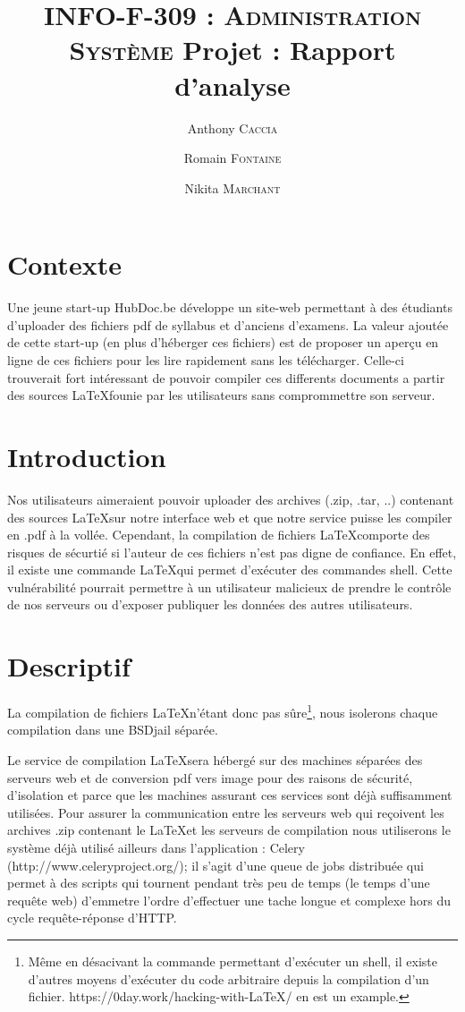 \documentclass[10pt,a4paper]{article}
\author{Anthony \textsc{Caccia} \and Romain \textsc{Fontaine} \and Nikita \textsc{Marchant} }
\date{}
\title{\textsc{INFO-F-309 : Administration Système} Projet : Rapport d'analyse}
\begin{document}
\maketitle

\section{Contexte}

Une jeune start-up HubDoc.be développe un site-web permettant à des étudiants d'uploader des fichiers pdf de syllabus et d'anciens d'examens.
La valeur ajoutée de cette start-up (en plus d'héberger ces fichiers) est de proposer un aperçu en ligne de ces fichiers pour les lire rapidement sans les télécharger.
Celle-ci trouverait fort intéressant de pouvoir compiler ces differents documents a partir des sources \LaTeX founie par les utilisateurs sans comprommettre son serveur.


\section{Introduction}

Nos utilisateurs aimeraient pouvoir uploader des archives (.zip, .tar, ..) contenant des sources \LaTeX sur notre interface web et que notre service puisse les compiler en .pdf à la vollée.
Cependant, la compilation de fichiers \LaTeX comporte des risques de sécurtié si l'auteur de ces fichiers n'est pas digne de confiance.
En effet, il existe une commande \LaTeX qui permet d'exécuter des commandes shell.
Cette vulnérabilité pourrait permettre à un utilisateur malicieux de prendre le contrôle de nos serveurs ou d'exposer publiquer les données des autres utilisateurs.

\section{Descriptif}

La compilation de fichiers \LaTeX n'étant donc pas sûre\footnote{Même en désacivant la commande permettant d'exécuter un shell, il existe d'autres moyens d'exécuter du code arbitraire depuis la compilation d'un fichier. https://0day.work/hacking-with-LaTeX/ en est un example.}, nous isolerons chaque compilation dans une BSDjail séparée.

Le service de compilation \LaTeX sera hébergé sur des machines séparées des serveurs web et de conversion pdf vers image pour des raisons de sécurité, d'isolation et parce que les machines assurant ces services sont déjà suffisamment utilisées.
Pour assurer la communication entre les serveurs web qui reçoivent les archives .zip contenant le \LaTeX et les serveurs de compilation nous utiliserons le système déjà utilisé ailleurs dans l'application :
Celery (http://www.celeryproject.org/); il s'agit d'une queue de jobs distribuée qui permet à des scripts qui tournent pendant très peu de temps (le temps d'une requête web) d'emmetre l'ordre d'effectuer une tache longue et complexe hors du cycle requête-réponse d'HTTP.
\end{document}
